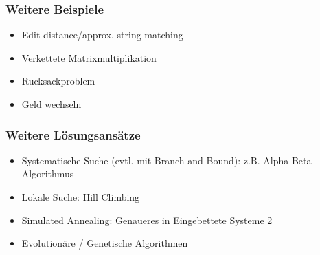 \begin{frame}
\frametitle{Weitere Beispiele}
\begin{itemize}
\item Edit distance/approx. string matching
\item Verkettete Matrixmultiplikation
\item Rucksackproblem
\item Geld wechseln
\end{itemize}
\end{frame}

\begin{frame}
\frametitle{Weitere Lösungsansätze}
\begin{itemize}
\item Systematische Suche (evtl. mit Branch and Bound): z.B. Alpha-Beta-Algorithmus\pause
\item Lokale Suche: Hill Climbing\pause
\item Simulated Annealing: Genaueres in Eingebettete Systeme 2\pause
\item Evolutionäre / Genetische Algorithmen
\end{itemize}
\end{frame}
